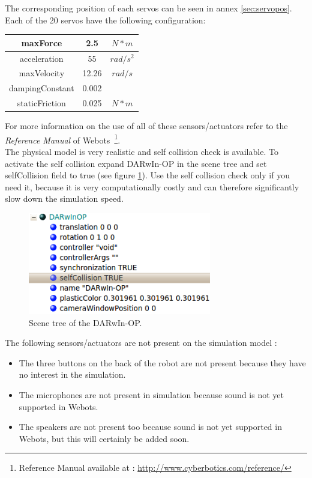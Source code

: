 \documentclass[a4paper, 12pt]{article}  		%
\begin{document}
The corresponding position of each servos can be seen in annex \ref{sec:servopos}.\\
Each of the 20 servos have the following configuration:
\begin{table}[H]
\begin{center}
\begin{tabular}{ | c | c | c | }
\hline
maxForce & 2.5 & $N*m$ \\ 
\hline
acceleration & 55 & $rad/s^{2}$ \\ 
\hline
maxVelocity & 12.26 & $rad/s$ \\ 
\hline
dampingConstant & 0.002 & $ $ \\ 
\hline
staticFriction & 0.025 & $N*m$ \\ 
\hline
\end{tabular}
\label{tab::servosConfig}
\end{center}
\end{table}

For more information on the use of all of these sensors/actuators refer to the \textit{Reference Manual} of Webots \,\footnote{ Reference Manual available at : \url{http://www.cyberbotics.com/reference/}}.\\

The physical model is very realistic and self collision check is available. To activate the self collision expand DARwIn-OP in the scene tree and set selfCollision field to true (see figure \ref{selfCollision}). Use the self collision check only if you need it, because it is very computationally costly and can therefore significantly slow down the simulation speed.\\

\begin{figure}[H]
\begin{center}
\includegraphics[width=8cm]{selfCollision.png}
\caption{Scene tree of the DARwIn-OP.}
\label{selfCollision}
\end{center}
\end{figure}

The following sensors/actuators are not present on the simulation model :
\begin{itemize}
\item The three buttons on the back of the robot are not present because they have no interest in the simulation.
\item The microphones are not present in simulation because sound is not yet supported in Webots.
\item The speakers are not present too because sound is not yet supported in Webots, but this will certainly be added soon. 
\end{itemize}
\end{document}
